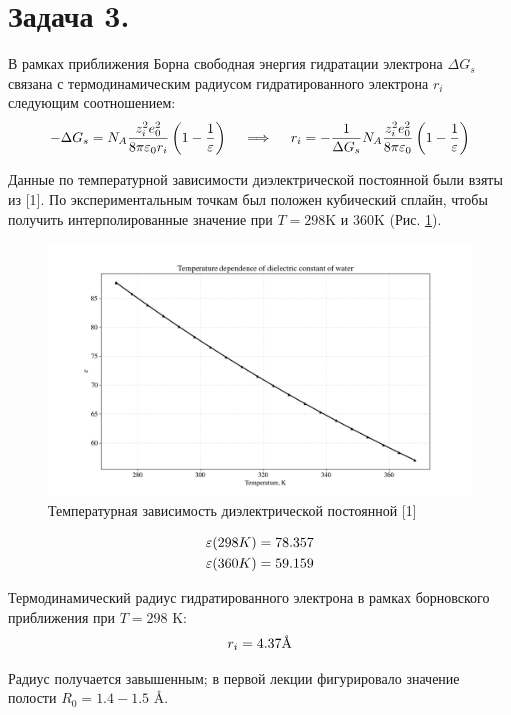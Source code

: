 \documentclass[14pt]{extarticle}
\newcommand{\lb}{\left(}
\newcommand{\rb}{\right)}
\begin{document}
\section*{Задача 3.}
В рамках приближения Борна свободная энергия гидратации электрона $\Delta G_s$ связана с термодинамическим радиусом гидратированного электрона $r_i$ следующим соотношением:
\begin{gather}
	- \Delta G_s = N_A \frac{z_i^2 e_0^2}{8 \pi \varepsilon_0 r_i} \lb 1 - \frac{1}{\varepsilon} \rb \quad \implies \quad r_i = - \frac{1}{\Delta G_s} N_A \frac{z_i^2 e_0^2}{8 \pi \varepsilon_0} \lb 1 - \frac{1}{\varepsilon} \rb \notag
\end{gather}

Данные по температурной зависимости диэлектрической постоянной были взяты из [1]. По экспериментальным точкам был положен кубический сплайн, чтобы получить интерполированные значение при $T = 298$K и $360$K (Рис. \ref{spline}).

\begin{figure}[H]
	\centering
	\includegraphics[width = 0.8\linewidth]{../pictures/dielec.png}
	\caption{Температурная зависимость диэлектрической постоянной [1]}
	\label{spline}
\end{figure}

\vspace*{-1cm}

\begin{gather}
	\varepsilon (298 K) =  78.357 \notag \\
	\varepsilon (360 K) =  59.159 \notag
\end{gather}

Термодинамический радиус гидратированного электрона в рамках борновского приближения при $T = 298$ K:
\begin{gather}
	r_i = 4.37 \textup{\AA} \notag
\end{gather}

Радиус получается завышенным; в первой лекции фигурировало значение полости $R_0 = 1.4-1.5$ \AA.
\end{document}
